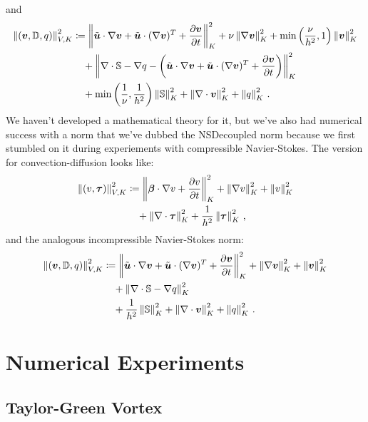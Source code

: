 \documentclass[Dissertation.tex]{subbIles}
\begin{document}
and
\begin{align*}
\left\| \left( \boldsymbol v,\mathbb{D},q \right) \right\|_{V,K}^2 &\coloneqq
\left\| \tilde{\boldsymbol u}\cdot\nabla\boldsymbol v +\tilde{\boldsymbol u}\cdot(\nabla\boldsymbol v)^T+\frac{\partial\boldsymbol v}{\partial t} \right\|_K^2
+ \nu\left\| \nabla\boldsymbol v \right\|_K^2
+ \min\left( \frac{\nu}{h^2},1 \right)\left\| \boldsymbol v \right\|^2_K
\\\nonumber&\quad
+ \left\| \nabla\cdot\mathbb{S}-\nabla q-\left( \tilde{\boldsymbol u}\cdot\nabla\boldsymbol v +\tilde{\boldsymbol u}\cdot(\nabla\boldsymbol v)^T+\frac{\partial\boldsymbol v}{\partial t} \right) \right\|_K^2
\\\nonumber&\quad
+ \min\left( \frac{1}{\nu},\frac{1}{h^2} \right)\left\| \mathbb{S} \right\|_K^2
+\left\| \nabla\cdot\boldsymbol v \right\|_K^2
+\left\| q \right\|_K^2
\,.
\end{align*}
We haven't developed a mathematical theory for it, but we've also had numerical success with a norm that 
we've dubbed the NSDecoupled norm because we first stumbled on it during experiements with compressible
Navier-Stokes.
The version for convection-diffusion looks like:
\begin{align*}
\left\| \left( v,\boldsymbol\tau \right) \right\|_{V,K}^2 &\coloneqq
\left\| \boldsymbol\beta\cdot\nabla v+\frac{\partial v}{\partial t} \right\|_K^2
+ \left\| \nabla v \right\|_K^2
+ \left\| v \right\|^2_K
\\\nonumber&\quad
+ \left\| \nabla\cdot \boldsymbol\tau \right\|_K^2
+ \frac{1}{h^2}\left\| \boldsymbol\tau \right\|_K^2\,,
\end{align*}
and the analogous incompressible Navier-Stokes norm:
\begin{align*}
\left\| \left( \boldsymbol v,\mathbb{D},q \right) \right\|_{V,K}^2 &\coloneqq
\left\| \tilde{\boldsymbol u}\cdot\nabla\boldsymbol v +\tilde{\boldsymbol u}\cdot(\nabla\boldsymbol v)^T+\frac{\partial\boldsymbol v}{\partial t} \right\|_K^2
+ \left\| \nabla\boldsymbol v \right\|_K^2
+ \left\| \boldsymbol v \right\|^2_K
\\\nonumber&\quad
+ \left\| \nabla\cdot\mathbb{S}-\nabla q \right\|_K^2
\\\nonumber&\quad
+ \frac{1}{h^2}\left\| \mathbb{S} \right\|_K^2
+\left\| \nabla\cdot\boldsymbol v \right\|_K^2
+\left\| q \right\|_K^2
\,.
\end{align*}

\section{Numerical Experiments}
\subsection{Taylor-Green Vortex}
\end{document}
